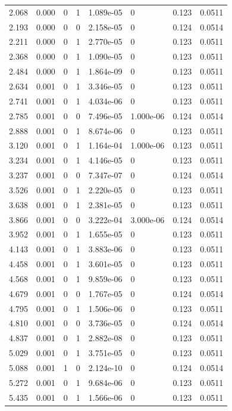 \documentclass[preview]{standalone}
\begin{document}
{{\begin{tabular}{L{1.2cm}C{1.2cm} C{0.3cm}C{0.5cm} C{1.4cm}C{1.4cm} C{1.4cm}C{1.4cm}}
  2.068  &  0.000  & 0     &  1 &  1.089e-05  & 0  & 0.123 &  0.0511   \\ 
  2.193  &  0.000  & 0     &  0 &  2.158e-05  & 0  & 0.124 &  0.0514   \\ 
  2.211  &  0.000  & 0     &  1 &  2.770e-05  & 0  & 0.123 &  0.0511   \\ 
  2.368  &  0.000  & 0     &  1 &  1.090e-05  & 0  & 0.123 &  0.0511   \\ 
  2.484  &  0.000  & 0     &  1 &  1.864e-09  & 0  & 0.123 &  0.0511   \\ 
  2.634  &  0.001  & 0     &  1 &  3.346e-05  & 0  & 0.123 &  0.0511   \\ 
  2.741  &  0.001  & 0     &  1 &  4.034e-06  & 0  & 0.123 &  0.0511   \\ 
  2.785  &  0.001  & 0     &  0 &  7.496e-05  & 1.000e-06  & 0.124 &  0.0514   \\ 
  2.888  &  0.001  & 0     &  1 &  8.674e-06  & 0  & 0.123 &  0.0511   \\ 
  3.120  &  0.001  & 0     &  1 &  1.164e-04  & 1.000e-06  & 0.123 &  0.0511   \\ 
  3.234  &  0.001  & 0     &  1 &  4.146e-05  & 0  & 0.123 &  0.0511   \\ 
  3.237  &  0.001  & 0     &  0 &  7.347e-07  & 0  & 0.124 &  0.0514   \\ 
  3.526  &  0.001  & 0     &  1 &  2.220e-05  & 0  & 0.123 &  0.0511   \\ 
  3.638  &  0.001  & 0     &  1 &  2.381e-05  & 0  & 0.123 &  0.0511   \\ 
  3.866  &  0.001  & 0     &  0 &  3.222e-04  & 3.000e-06  & 0.124 &  0.0514   \\ 
  3.952  &  0.001  & 0     &  1 &  1.655e-05  & 0  & 0.123 &  0.0511   \\ 
  4.143  &  0.001  & 0     &  1 &  3.883e-06  & 0  & 0.123 &  0.0511   \\ 
  4.458  &  0.001  & 0     &  1 &  3.601e-05  & 0  & 0.123 &  0.0511   \\ 
  4.568  &  0.001  & 0     &  1 &  9.859e-06  & 0  & 0.123 &  0.0511   \\ 
  4.679  &  0.001  & 0     &  0 &  1.767e-05  & 0  & 0.124 &  0.0514   \\ 
  4.795  &  0.001  & 0     &  1 &  1.506e-06  & 0  & 0.123 &  0.0511   \\ 
  4.810  &  0.001  & 0     &  0 &  3.736e-05  & 0  & 0.124 &  0.0514   \\ 
  4.837  &  0.001  & 0     &  1 &  2.882e-08  & 0  & 0.123 &  0.0511   \\ 
  5.029  &  0.001  & 0     &  1 &  3.751e-05  & 0  & 0.123 &  0.0511   \\ 
  5.088  &  0.001  & 1     &  0 &  2.124e-10  & 0  & 0.124 &  0.0514   \\ 
  5.272  &  0.001  & 0     &  1 &  9.684e-06  & 0  & 0.123 &  0.0511   \\ 
  5.435  &  0.001  & 0     &  1 &  1.566e-06  & 0  & 0.123 &  0.0511   \\ 
\hline 
\end{tabular} 

}}
\end{document}

